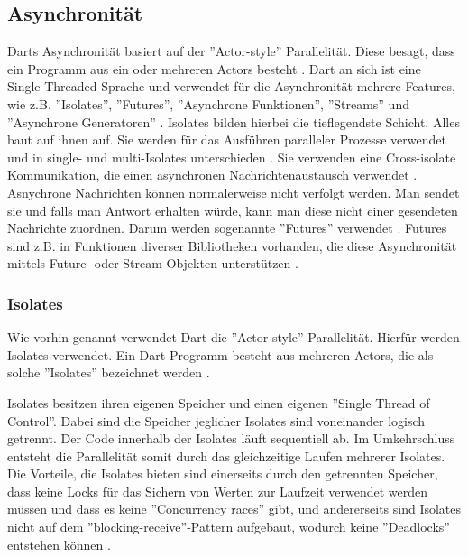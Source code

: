 \subsection{Asynchronität}
\label{subsec:Dart:Concurrency}
Darts Asynchronität basiert auf der ''Actor-style'' Parallelität. Diese besagt, dass ein Programm aus ein oder mehreren Actors besteht \cite{book:Dart:DPL_GiladBracha}.
Dart an sich ist eine Single-Threaded Sprache und verwendet für die Asynchronität mehrere Features, wie z.B. ''Isolates'', ''Futures'', ''Asynchrone Funktionen'', ''Streams'' und ''Asynchrone Generatoren'' \cite{book:Dart:StartGuideDart_SanjibSinha, book:Dart:DPL_GiladBracha}.
Isolates bilden hierbei die tieflegendste Schicht. Alles baut auf ihnen auf. Sie werden für das Ausführen paralleler Prozesse verwendet \cite{article:Dart:JavaAndDart_AfafMirghaniHassan} und in single- und multi-Isolates unterschieden \cite{book:Dart:DPL_GiladBracha}.
Sie verwenden eine Cross-isolate Kommunikation, die einen asynchronen Nachrichtenaustausch verwendet \cite{book:Dart:DPL_GiladBracha}.
Asnychrone Nachrichten können normalerweise nicht verfolgt werden. Man sendet sie und falls man Antwort erhalten würde, kann man diese nicht einer gesendeten Nachrichte zuordnen. Darum werden sogenannte ''Futures'' verwendet \cite{book:Dart:DPL_GiladBracha}.
Futures sind z.B. in Funktionen diverser Bibliotheken vorhanden, die diese Asynchronität mittels Future- oder Stream-Objekten unterstützen \cite{article:Dart:JavaAndDart_AfafMirghaniHassan}.

    \subsubsection{Isolates}
    \label{subsubsec:Dart:Concurrency:Isolates}
    Wie vorhin genannt verwendet Dart die ''Actor-style'' Parallelität. Hierfür werden Isolates verwendet. Ein Dart Programm besteht aus mehreren Actors, die als solche ''Isolates'' bezeichnet werden \cite{book:Dart:DPL_GiladBracha}.
    
    \noindent
    Isolates besitzen ihren eigenen Speicher und einen eigenen ''Single Thread of Control''. Dabei sind die Speicher jeglicher Isolates sind voneinander logisch getrennt.
    Der Code innerhalb der Isolates läuft sequentiell ab. Im Umkehrschluss entsteht die Parallelität somit durch das gleichzeitige Laufen mehrerer Isolates.
    Die Vorteile, die Isolates bieten sind einerseits durch den getrennten Speicher, dass keine Locks für das Sichern von Werten zur Laufzeit verwendet werden müssen und dass es keine ''Concurrency races'' gibt, und andererseits sind Isolates nicht auf dem ''blocking-receive''-Pattern aufgebaut, wodurch keine ''Deadlocks'' entstehen können \cite{book:Dart:DPL_GiladBracha}.

